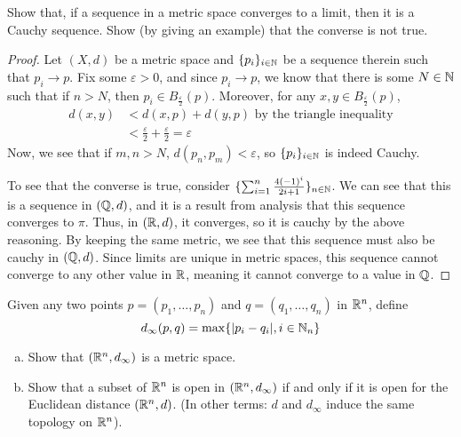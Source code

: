 \documentclass[./main.tex]{subfiles}
\begin{document}
\begin{fprob}
    Show that, if a sequence in a metric space converges to a limit, then it is a Cauchy
    sequence. Show (by giving an example) that the converse is not true.
\end{fprob}

\begin{proof}
	Let $(X,d)$ be a metric space and $\{p_i\}_{i\in\mathbb{N}}$ be a sequence therein such that $p_i\rightarrow p$. Fix some $\varepsilon>0$,
    	and since $p_i\rightarrow p$, we know that there is some $N\in\mathbb{N}$ such that if $n>N$, then $p_i\in B_{\frac{\varepsilon}{2}}(p)$.
	Moreover, for any $x,y\in B_{\frac{\varepsilon}{2}}(p)$,
	\begin{align*}
		d(x,y) &< d(x,p)+d(y,p) \text{ by the triangle inequality}\\
		&< \frac{\varepsilon}{2} + \frac{\varepsilon}{2} = \varepsilon
	\end{align*}
	Now, we see that if $m,n>N$, $d(p_n,p_m)<\varepsilon$, so $\{p_i\}_{i\in\mathbb{N}}$ is indeed Cauchy.

	To see that the converse is true, consider $\{\sum_{i=1}^n \frac{4(-1)^i}{2i+1}\}_{n\in\mathbb{N}}$. We can see that this is a sequence in 
	$(\mathbb{Q},d)$, and it is a result from analysis that this sequence converges to $\pi$. Thus, in $(\mathbb{R}, d)$, it converges, so it is 
	cauchy by the above reasoning. By keeping the same metric, we see that this sequence must also be cauchy in $(\mathbb{Q}, d)$. Since limits
    are unique in metric spaces, this sequence cannot converge to any other value in $\mathbb{R}$, meaning it cannot converge to a value in $\mathbb{Q}$.
\end{proof}

\begin{fprob}
    Given any two points $p = (p_1,\dots,p_n)$ and $q = (q_1,\dots, q_n)$ in $\mathbb{R}^n$, define
    \[
        d_\infty(p,q) = \max\{|p_i-q_i|, i\in\mathbb{N}_n\}  
    \]
    \begin{enumerate}[(a)]
        \item Show that $(\mathbb{R}^n,d_\infty)$ is a metric space.
        \item Show that a subset of $\mathbb{R}^n$ is open in $(\mathbb{R}^n,d_\infty)$ if and only if it is open 
        for the Euclidean distance $(\mathbb{R}^n,d)$. (In other terms: $d$ and $d_\infty$ induce the same 
        topology on $\mathbb{R}^n$).
    \end{enumerate}
\end{fprob}
\end{document}
